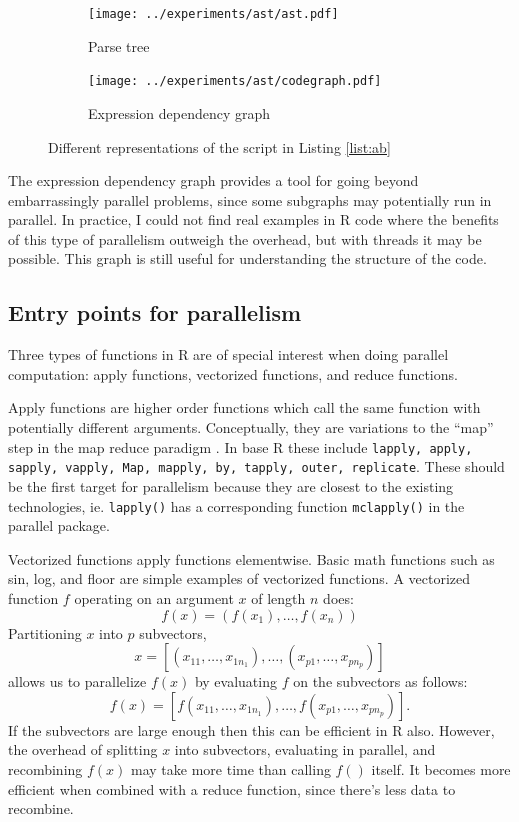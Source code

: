 \documentclass[12pt]{article}
\begin{document}


\begin{figure}
\centering
\begin{subfigure}{.6\textwidth}
    \centering
    \texttt{[image: ../experiments/ast/ast.pdf]}
    \caption{Parse tree}
    \label{fig:ast}
\end{subfigure}%
\begin{subfigure}{.4\textwidth}
  \centering
  \texttt{[image: ../experiments/ast/codegraph.pdf]}
  \caption{Expression dependency graph}
  \label{fig:codegraph}
\end{subfigure}
\caption{Different representations of the script in Listing \ref{list:ab}}
\end{figure}

The expression dependency graph provides a tool for going beyond
embarrassingly parallel problems, since some subgraphs may potentially run
in parallel. In practice, I could not find real examples in R code where
the benefits of this type of parallelism outweigh the overhead, but with
threads it may be possible. This graph is still useful for understanding
the structure of the code.

\subsection{Entry points for parallelism}

Three types of functions in R are of special interest when doing parallel
computation: apply functions, vectorized functions, and reduce functions.

Apply functions are higher order functions which call the same function
with potentially different arguments. Conceptually, they are variations to the ``map''
step in the map reduce paradigm \cite{dean2008mapreduce}.  In base R these
include \texttt{lapply, apply, sapply, vapply, Map, mapply, by, tapply,
outer, replicate}. These should be the first target for parallelism because
they are closest to the existing technologies, ie. \texttt{lapply()} has a
corresponding function \texttt{mclapply()} in the parallel package.

Vectorized functions apply functions elementwise. Basic math functions such
as sin, log, and floor are simple examples of vectorized functions.  A
vectorized function $f$ operating on an argument $x$ of length $n$ does:
\begin{equation}
\label{eq:vectorization}
    f(x) = (f(x_1), \dots, f(x_n))
\end{equation}
Partitioning $x$ into $p$ subvectors, 
\[
    x = \left[ (x_{11}, \dots, x_{1 n_1}), \dots, (x_{p 1}, \dots, x_{p
n_p}) \right]
\]
allows us to parallelize $f(x)$ by evaluating $f$ on the subvectors as follows:
\[
    f(x) = \left[ f(x_{11}, \dots, x_{1 n_1}), \dots, f(x_{p 1}, \dots, x_{p
n_p}) \right].
\]
If the subvectors are large enough then this can be efficient in R also.
However, the overhead of splitting $x$ into subvectors, evaluating in
parallel, and recombining $f(x)$ may take more time than calling $f()$
itself. It becomes more efficient when combined with a reduce function,
since there's less data to recombine.
\end{document}
